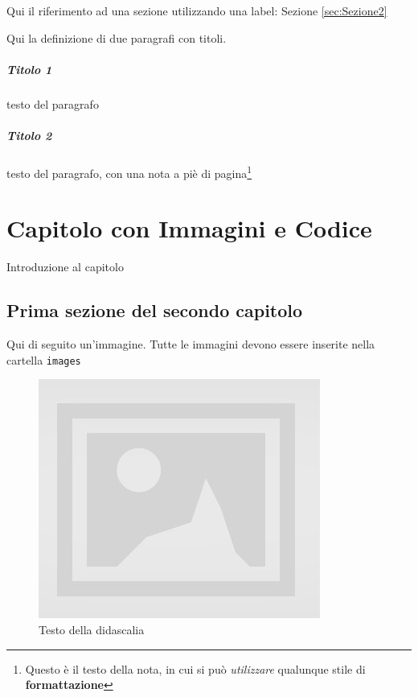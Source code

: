 Qui il riferimento ad una sezione utilizzando una label: Sezione \ref{sec:Sezione2}

Qui la definizione di due paragrafi con titoli.

\paragraph{Titolo 1} testo del paragrafo

\paragraph{Titolo 2} testo del paragrafo, con una nota a piè di pagina\footnote{Questo è il testo della nota, in cui si può \textit{utilizzare} qualunque stile di \textbf{formattazione}}



\chapter{Capitolo con Immagini e Codice}

Introduzione al capitolo

\section{Prima sezione del secondo capitolo}

Qui di seguito un'immagine. Tutte le immagini devono essere inserite nella cartella \texttt{images}

\begin{figure}[H]
\centering
\includegraphics[scale=0.8]{images/placeholder.jpg}
\caption{Testo della didascalia}
\label{fig:figure1}
\end{figure}

